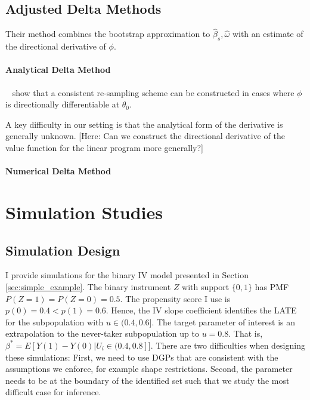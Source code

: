 \documentclass[12pt,a4paper,english]{article} %
\numberwithin{equation}{section}
\theoremstyle{definition}
\theoremstyle{remark}
\theoremstyle{plain}
\begin{document}
\subsection{Adjusted Delta Methods}
Their method combines the bootstrap approximation to $\hat{\beta}_s, \hat{\omega}$ with an estimate of the directional derivative of $\phi$.

\paragraph{Analytical Delta Method}
~\cite{fang2019infdirdiff} show that a consistent re-sampling scheme can be constructed in cases where $\phi$ is directionally differentiable at $\theta_0$.

A key difficulty in our setting is that the analytical form of the derivative is generally unknown.
[Here: Can we construct the directional derivative of the value function for the linear program more generally?]

\paragraph{Numerical Delta Method}

\section{Simulation Studies}\label{sec:simulation_studies}

\subsection{Simulation Design}
I provide simulations for the binary IV model presented in Section \ref{sec:simple_example}.
The binary instrument $Z$ with support $\{0,1\}$ has PMF $P(Z=1) = P(Z=0) = 0.5$.
The propensity score I use is $p(0) = 0.4 < p(1) = 0.6$.
Hence, the IV slope coefficient identifies the LATE for the subpopulation with $u\in(0.4, 0.6]$.
The target parameter of interest is an extrapolation to the never-taker subpopulation up to $u=0.8$.
That is, $\beta^* = E[Y(1) - Y(0) | U_i \in (0.4, 0.8]]$.
There are two difficulties when designing these simulations: First, we need to use DGPs that are consistent with the assumptions we enforce, for example shape restrictions.
Second, the parameter needs to be at the boundary of the identified set such that we study the most difficult case for inference.
\end{document}
